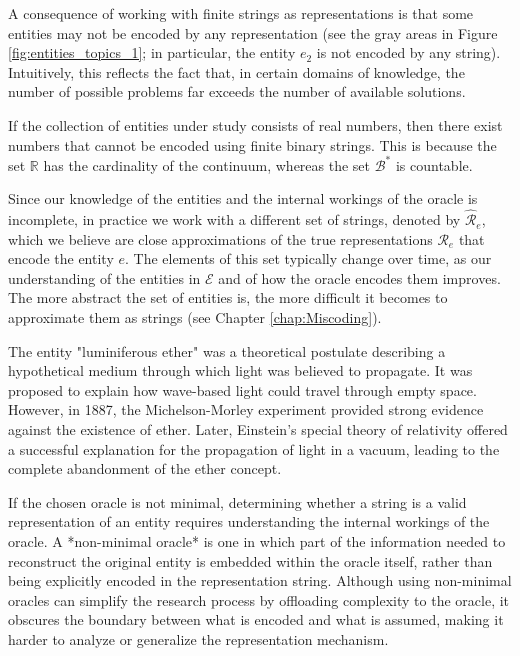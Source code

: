 
A consequence of working with finite strings as representations is that some entities may not be encoded by any representation (see the gray areas in Figure \ref{fig:entities_topics_1}; in particular, the entity $e_2$ is not encoded by any string). Intuitively, this reflects the fact that, in certain domains of knowledge, the number of possible problems far exceeds the number of available solutions.

\begin{example}
If the collection of entities under study consists of real numbers, then there exist numbers that cannot be encoded using finite binary strings. This is because the set $\mathbb{R}$ has the cardinality of the continuum, whereas the set $\mathcal{B}^\ast$ is countable.
\end{example}

Since our knowledge of the entities and the internal workings of the oracle is incomplete, in practice we work with a different set of strings, denoted by $\hat{\mathcal{R}}_e$, which we believe are close approximations of the true representations $\mathcal{R}_e$ that encode the entity $e$. The elements of this set typically change over time, as our understanding of the entities in $\mathcal{E}$ and of how the oracle encodes them improves. The more abstract the set of entities is, the more difficult it becomes to approximate them as strings (see Chapter \ref{chap:Miscoding}).

\begin{example}
\label{ex:luminiferous_ether}
The entity "luminiferous ether" was a theoretical postulate describing a hypothetical medium through which light was believed to propagate. It was proposed to explain how wave-based light could travel through empty space. However, in 1887, the Michelson-Morley experiment provided strong evidence against the existence of ether. Later, Einstein's special theory of relativity offered a successful explanation for the propagation of light in a vacuum, leading to the complete abandonment of the ether concept.
\end{example}

If the chosen oracle is not minimal, determining whether a string is a valid representation of an entity requires understanding the internal workings of the oracle. A *non-minimal oracle* is one in which part of the information needed to reconstruct the original entity is embedded within the oracle itself, rather than being explicitly encoded in the representation string. Although using non-minimal oracles can simplify the research process by offloading complexity to the oracle, it obscures the boundary between what is encoded and what is assumed, making it harder to analyze or generalize the representation mechanism.

